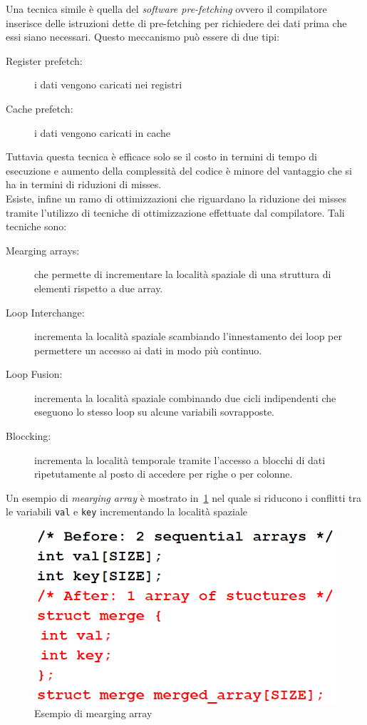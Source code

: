 Una tecnica simile è quella del \emph{software pre-fetching} ovvero il compilatore inserisce delle istruzioni dette di pre-fetching per richiedere dei dati prima che essi siano necessari. Questo meccanismo può essere di due tipi:
\begin{description}
\item[Register prefetch:] i dati vengono caricati nei registri
\item[Cache prefetch:] i dati vengono caricati in cache
\end{description}
Tuttavia questa tecnica è efficace solo se il costo in termini di tempo di esecuzione e aumento della complessità del codice è minore del vantaggio che si ha in termini di riduzioni di misses.\\
Esiste, infine un ramo di ottimizzazioni che riguardano la riduzione dei misses tramite l'utilizzo di tecniche di ottimizzazione effettuate dal compilatore.
Tali tecniche sono:
\begin{description}
\item[Mearging arrays:] che permette di incrementare la località spaziale di una struttura di elementi rispetto a due array.
\item[Loop Interchange:] incrementa la località spaziale scambiando l'innestamento dei loop per permettere un accesso ai dati in modo più continuo.
\item[Loop Fusion:] incrementa la località spaziale combinando due cicli indipendenti che eseguono lo stesso loop su alcune variabili sovrapposte.
\item[Bloccking:] incrementa la località temporale tramite l'accesso a blocchi di dati ripetutamente al posto di accedere per righe o per colonne.
\end{description}
Un esempio di \emph{mearging array} è mostrato in \figurename\,\ref{fig:meargingarray} nel quale si riducono i conflitti tra le variabili \texttt{val} e \texttt{key} incrementando la località spaziale
\begin{figure}[htb]
\centering
\includegraphics[scale=0.5]{img/meargingarray.png}
\caption{Esempio di mearging array}\label{fig:meargingarray}
\end{figure}
